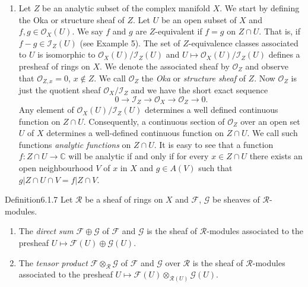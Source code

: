 \begin{enumerate}[start=24]
\item Let $Z$ be an analytic subset of the complex manifold $X$. We start by defining the Oka or structure sheaf of $Z$. Let $U$ be an open subset of $X$ and $f,g\in\mathcal O_X(U)$. We say $f$ and $g$ are $Z$-equivalent if $f=g$ on $Z\cap U$. That is, if $f-g\in\mathcal I_Z(U)$ (see Example 5). The set of $Z$-equivalence classes associated to $U$ is isomorphic to $\mathcal O_X(U)/\mathcal I_Z(U)$ and $U\mapsto\mathcal O_X(U)/\mathcal I_Z(U)$ defines a presheaf of rings on $X$. We denote the associated sheaf by $\mathcal O_Z$ and observe that $\mathcal O_{Z,x}=0$, $x\notin Z$. We call $\mathcal O_Z$ the \emph{Oka} or \emph{structure sheaf} of $Z$. Now $\mathcal O_Z$ is just the quotient sheaf $\mathcal O_X/\mathcal I_Z$ and we have the short exact sequence
\[
0\to\mathcal I_Z\to\mathcal O_X\to\mathcal O_Z\to0.
\]
Any element of $\mathcal O_X(U)/\mathcal I_Z(U)$ determines a well defined continuous function on $Z\cap U$. Consequently, a continuous section of $\mathcal O_Z$ over an open set $U$ of $X$ determines a well-defined continuous function on $Z\cap U$. We call such functions \emph{analytic functions} on $Z\cap U$. It is easy to see that a function $f:Z\cap U\to\mathbb C$ will be analytic if and only if for every $x\in Z\cap U$ there exists an open neighbourhood $V$ of $x$ in $X$ and $g\in A(V)$ such that $g|Z\cap U\cap V=f|Z\cap V$.
\end{enumerate}
\begin{originaltheorem}{Definition}{6.1.7}
Let $\mathcal R$ be a sheaf of rings on $X$ and $\mathcal F$, $\mathcal G$ be sheaves of $\mathcal R$-modules.
\begin{enumerate}
\item The \emph{direct sum} $\mathcal F\oplus\mathcal G$ of $\mathcal F$ and $\mathcal G$ is the sheaf of $\mathcal R$-modules associated to the presheaf $U\mapsto\mathcal F(U)\oplus\mathcal G(U)$.
\item The \emph{tensor product} $\mathcal F\otimes_{\mathcal R}\mathcal G$ of $\mathcal F$ and $\mathcal G$ over $\mathcal R$ is the sheaf of $\mathcal R$-modules associated to the presheaf $U\mapsto\mathcal F(U)\otimes_{\mathcal R(U)}\mathcal G(U)$.
\end{enumerate}
\end{originaltheorem}
